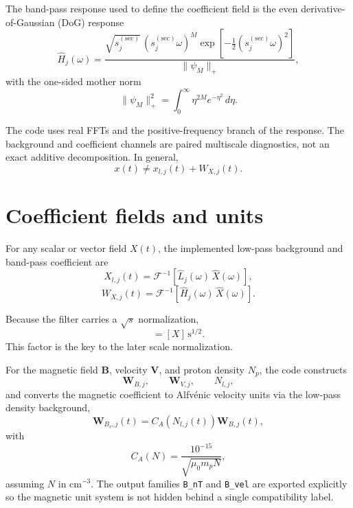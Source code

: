 \documentclass[11pt]{article}
\begin{document}
The band-pass response used to define the coefficient field is the even derivative-of-Gaussian (DoG) response
\begin{equation}
 \widehat{H}_j(\omega) = \frac{\sqrt{s_j^{(\mathrm{sec})}}\,(s_j^{(\mathrm{sec})}\omega)^M \exp\!\left[-\tfrac{1}{2}(s_j^{(\mathrm{sec})}\omega)^2\right]}{\|\psi_M\|_+},
\end{equation}
with the one-sided mother norm
\begin{equation}
 \|\psi_M\|_+^2 = \int_0^{\infty} \eta^{2M} e^{-\eta^2}\,d\eta.
\end{equation}

The code uses real FFTs and the positive-frequency branch of the response. The background and coefficient channels are paired multiscale diagnostics, not an exact additive decomposition. In general,
\begin{equation}
 x(t) \neq x_{l,j}(t) + W_{X,j}(t).
\end{equation}

\section{Coefficient fields and units}

For any scalar or vector field $X(t)$, the implemented low-pass background and band-pass coefficient are
\begin{equation}
 X_{l,j}(t) = \mathcal{F}^{-1}\!\left[\widehat{L}_j(\omega)\,\widehat{X}(\omega)\right],
\end{equation}
\begin{equation}
 W_{X,j}(t) = \mathcal{F}^{-1}\!\left[\widehat{H}_j(\omega)\,\widehat{X}(\omega)\right].
\end{equation}

Because the filter carries a $\sqrt{s}$ normalization,
\begin{equation}
 [W_{X,j}] = [X] \, \mathrm{s}^{1/2}.
\end{equation}
This factor is the key to the later scale normalization.

For the magnetic field $\mathbf{B}$, velocity $\mathbf{V}$, and proton density $N_p$, the code constructs
\begin{equation}
 \mathbf{W}_{B,j},\qquad \mathbf{W}_{V,j},\qquad N_{l,j},
\end{equation}
and converts the magnetic coefficient to Alfv\'enic velocity units via the low-pass density background,
\begin{equation}
 \mathbf{W}_{B_v,j}(t) = C_A\!\left(N_{l,j}(t)\right)\mathbf{W}_{B,j}(t),
\end{equation}
with
\begin{equation}
 C_A(N) = \frac{10^{-15}}{\sqrt{\mu_0 m_p N}},
\end{equation}
assuming $N$ in cm$^{-3}$. The output families \texttt{B\_nT} and \texttt{B\_vel} are exported explicitly so the magnetic unit system is not hidden behind a single compatibility label.
\end{document}
